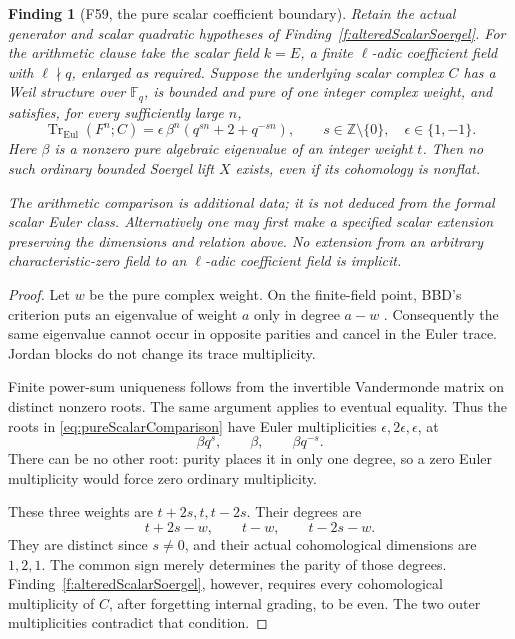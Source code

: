 \documentclass[11pt,a4paper]{article}
\newcommand{\fid}[1]{\textsf{#1}}\newcommand{\gate}[1]{\textsf{#1}}
\theoremstyle{named}\newtheorem{finding}{Finding}[section]
\theoremstyle{definition}\newtheorem{definition}[finding]{Definition}
\theoremstyle{remark}\newtheorem{remark}[finding]{Remark}
\begin{document}
\begin{finding}[\fid{F59}, the pure scalar coefficient boundary]
\label{f:pureScalarSoergelNoGo}
Retain the actual generator and scalar quadratic hypotheses
of Finding~\ref{f:alteredScalarSoergel}. For the arithmetic
clause take the scalar field \(k=E\), a finite
\(\ell\)-adic coefficient field with \(\ell\nmid q\),
enlarged as required.
Suppose the underlying scalar complex \(C\) has a Weil
structure over \(\mathbb F_q\), is bounded and pure of
one integer complex weight, and satisfies, for every
sufficiently large \(n\),
\begin{equation}\label{eq:pureScalarComparison}
 \operatorname{Tr}_{\mathrm{Eul}}(F^n;C)
  =\epsilon\,\beta^n(q^{sn}+2+q^{-sn}),
 \qquad s\in\mathbb Z\setminus\{0\},\quad
 \epsilon\in\{1,-1\}.
\end{equation}
Here \(\beta\) is a nonzero pure algebraic eigenvalue
of an integer weight \(t\). Then no such ordinary
bounded Soergel lift \(X\) exists, even if its cohomology
is nonflat.

The arithmetic comparison is additional data; it is not
deduced from the formal scalar Euler class.
Alternatively one may first make a specified scalar
extension preserving the dimensions and relation above.
No extension from an arbitrary characteristic-zero field
to an \(\ell\)-adic coefficient field is implicit.
\end{finding}

\begin{proof}
Let \(w\) be the pure complex weight. On the finite-field
point, BBD's criterion puts an eigenvalue of weight \(a\)
only in degree \(a-w\)
\cite[5.1.8, pp.~126--127]{BBD}.
Consequently the same eigenvalue cannot occur in
opposite parities and cancel in the Euler trace.
Jordan blocks do not change its trace multiplicity.

Finite power-sum uniqueness follows from the invertible
Vandermonde matrix on distinct nonzero roots. The same
argument applies to eventual equality.
Thus the roots in \eqref{eq:pureScalarComparison} have
Euler multiplicities \(\epsilon,2\epsilon,\epsilon\),
at
\[
                     \beta q^s,\qquad \beta,\qquad\beta q^{-s}.
\]
There can be no other root: purity places it in only
one degree, so a zero Euler multiplicity would force
zero ordinary multiplicity.

These three weights are \(t+2s,t,t-2s\). Their degrees
are
\[
                     t+2s-w,\qquad t-w,\qquad t-2s-w.
\]
They are distinct since \(s\ne0\), and their actual
cohomological dimensions are \(1,2,1\). The common
sign merely determines the parity of those degrees.
Finding~\ref{f:alteredScalarSoergel}, however, requires
every cohomological multiplicity of \(C\), after
forgetting internal grading, to be even.
The two outer multiplicities contradict that condition.
\end{proof}
\end{document}
